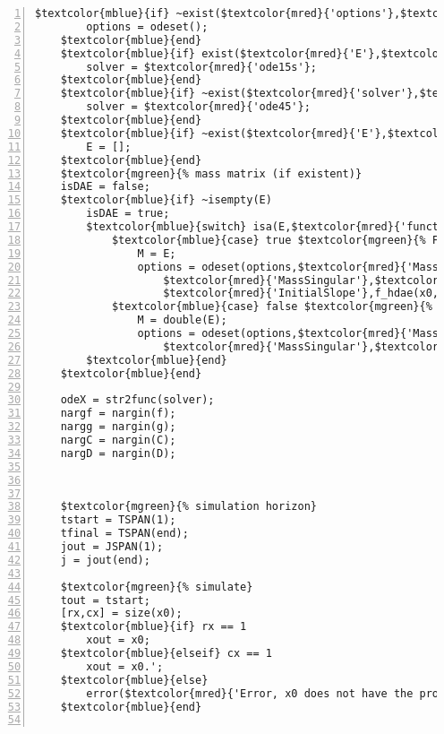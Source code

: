 \begin{Verbatim}[commandchars=\$\{\},numbers=left,numbersep=2pt]
    $textcolor{mblue}{if} ~exist($textcolor{mred}{'options'},$textcolor{mred}{'var'}) 
        options = odeset(); 
    $textcolor{mblue}{end} 
    $textcolor{mblue}{if} exist($textcolor{mred}{'E'},$textcolor{mred}{$textcolor{mred}{'var'}}) && ~exist($textcolor{mred}{'solver'},$textcolor{mred}{$textcolor{mred}{'var'}}) 
        solver = $textcolor{mred}{'ode15s'}; 
    $textcolor{mblue}{end} 
    $textcolor{mblue}{if} ~exist($textcolor{mred}{'solver'},$textcolor{mred}{'var'}) 
        solver = $textcolor{mred}{'ode45'}; 
    $textcolor{mblue}{end} 
    $textcolor{mblue}{if} ~exist($textcolor{mred}{'E'},$textcolor{mred}{'var'}) 
        E = []; 
    $textcolor{mblue}{end} 
    $textcolor{mgreen}{% mass matrix (if existent)} 
    isDAE = false; 
    $textcolor{mblue}{if} ~isempty(E) 
        isDAE = true; 
        $textcolor{mblue}{switch} isa(E,$textcolor{mred}{'function_handle'}) 
            $textcolor{mblue}{case} true $textcolor{mgreen}{% Function E(x)} 
                M = E; 
                options = odeset(options,$textcolor{mred}{'Mass'},M,$textcolor{mred}{'Stats'},$textcolor{mred}{'off'},... 
                    $textcolor{mred}{'MassSingular'},$textcolor{mred}{'maybe'},$textcolor{mred}{'MStateDependence'},$textcolor{mred}{'strong'},... 
                    $textcolor{mred}{'InitialSlope'},f_hdae(x0,TSPAN(1)));  
            $textcolor{mblue}{case} false $textcolor{mgreen}{% Constant double matrix} 
                M = double(E); 
                options = odeset(options,$textcolor{mred}{'Mass'},M,$textcolor{mred}{'Stats'},$textcolor{mred}{'off'},... 
                    $textcolor{mred}{'MassSingular'},$textcolor{mred}{'maybe'},$textcolor{mred}{'MStateDependence'},$textcolor{mred}{'none'}); 
        $textcolor{mblue}{end} 
    $textcolor{mblue}{end} 
     
    odeX = str2func(solver); 
    nargf = nargin(f); 
    nargg = nargin(g); 
    nargC = nargin(C); 
    nargD = nargin(D); 
     
     
     
    $textcolor{mgreen}{% simulation horizon} 
    tstart = TSPAN(1); 
    tfinal = TSPAN(end); 
    jout = JSPAN(1); 
    j = jout(end); 
     
    $textcolor{mgreen}{% simulate} 
    tout = tstart; 
    [rx,cx] = size(x0); 
    $textcolor{mblue}{if} rx == 1 
        xout = x0; 
    $textcolor{mblue}{elseif} cx == 1 
        xout = x0.'; 
    $textcolor{mblue}{else} 
        error($textcolor{mred}{'Error, x0 does not have the proper size'}) 
    $textcolor{mblue}{end} 
     

\end{Verbatim}
